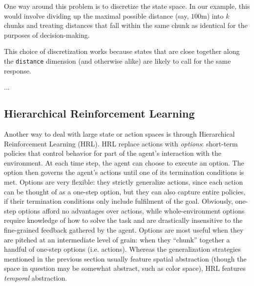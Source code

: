 \documentclass{article}
\begin{document}
One way around this problem is to discretize the state space.
In our example, this would involve dividing up the maximal possible distance (say, $100$m) into $k$ chunks and treating distances that fall within the same chunk as identical for the purposes of decision-making.

This choice of discretization works because states that are close together along the \texttt{distance} dimension (and otherwise alike) are likely to call for the same response.

...

%

\subsection{Hierarchical Reinforcement Learning}

Another way to deal with large state or action spaces is through Hierarchical Reinforcement Learning (HRL).
HRL replace actions with \emph{options}: short-term policies that control behavior for part of the agent's interaction with the environment. 
At each time step, the agent can choose to execute an option.
The option then governs the agent's actions until one of its termination conditions is met.
Options are very flexible: they strictly generalize actions, since each action can be thought of as a one-step option, but they can also capture entire policies, if their termination conditions only include fulfilment of the goal.
Obviously, one-step options afford no advantages over actions, while whole-environment options require knowledge of how to solve the task and are drastically insensitive to the fine-grained feedback gathered by the agent.
Options are most useful when they are pitched at an intermediate level of grain: when they ``chunk'' together a handful of one-step options (i.e. actions).
Whereas the generalization strategies mentioned in the previous section usually feature spatial abstraction (though the space in question may be somewhat abstract, such as color space), HRL features \emph{temporal} abstraction.
\end{document}
